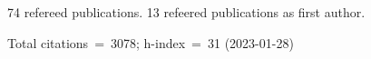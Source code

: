 74 refereed publications. 13 refeered publications as first author.

Total citations~=~3078; h-index~=~31 (2023-01-28)